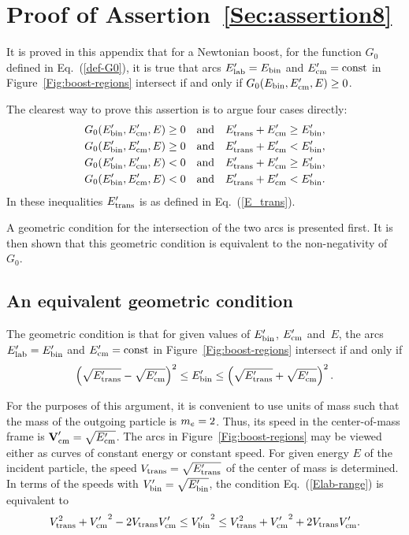 \chapter{Proof of Assertion~\ref{Sec:assertion8}}
\label{Sec:Appendix-B}
It is proved in this appendix that for a Newtonian boost,
for the function $G_0$ defined in Eq.~(\ref{def-G0}),
it is true that arcs $E_{\text{lab}}' = E_{\text{bin}}$ and
$E_{\text{cm}}' = \text{const}$ in Figure~\ref{Fig:boost-regions} intersect if and only if
$G_0( E_{\text{bin}}, E_{\text{cm}}', E ) \ge 0$.

The clearest way to prove this assertion is to
argue four cases directly:
 \begin{align}
  G_0( E_{\text{bin}}',  E_{\text{cm}}', E ) \ge 0 & \quad \text{and}
    \quad E_{\text{trans}}' + E_{\text{cm}}' \ge E_{\text{bin}}',
    \label{first-G0}\\
  G_0( E_{\text{bin}}',  E_{\text{cm}}', E ) \ge 0 & \quad \text{and}
    \quad E_{\text{trans}}' + E_{\text{cm}}' < E_{\text{bin}}', \\
  G_0( E_{\text{bin}}',  E_{\text{cm}}', E ) < 0 & \quad \text{and}
    \quad E_{\text{trans}}' + E_{\text{cm}}' \ge E_{\text{bin}}', \\
   G_0( E_{\text{bin}}',  E_{\text{cm}}', E ) < 0 & \quad \text{and}
    \quad E_{\text{trans}}' + E_{\text{cm}}' < E_{\text{bin}}'.
 \end{align}
 In these inequalities $E_{\text{trans}}'$ is as defined in Eq.~(\ref{E_trans}).

A geometric condition for the intersection of
the two arcs is presented first.  It is then shown that this geometric condition is equivalent
to the non-negativity of~$G_0$.  

\section{An equivalent geometric condition}
The geometric condition is that for given values of $E_{\text{bin}}'$, $E_{\text{cm}}'$ and~$E$,
the arcs $E_{\text{lab}}' = E_{\text{bin}}'$ and
$E_{\text{cm}}' = \text{const}$ in Figure~\ref{Fig:boost-regions} intersect if and only if
\begin{equation}
  \left( \sqrt{E_{\text{trans}}'} - \sqrt{E_{\text{cm}}'} \right)^2 \le E_{\text{bin}}' \le
    \left( \sqrt{E_{\text{trans}}'} + \sqrt{E_{\text{cm}}'} \right)^2.
  \label{Elab-range}
\end{equation}

For the purposes of this argument, it is
convenient to use units of mass such that the mass of the outgoing particle
is $m_e = 2$.  Thus, its speed in the center-of-mass frame is
$\textbf{V}_{\text{cm}}' = \sqrt{E_{\text{cm}}'}$.  The arcs in
Figure~\ref{Fig:boost-regions} may be viewed either as curves of constant energy or constant speed.  For given
energy $E$ of the incident particle, the speed $V_{\text{trans}} = \sqrt{E_{\text{trans}}'}$ of
the center of mass is determined.  In terms of the speeds with
$V_{\text{bin}}' = \sqrt{E_{\text{bin}}'}$, the condition
Eq.~(\ref{Elab-range}) is equivalent to
\begin{equation}
  V_{\text{trans}}^2 + {V_{\text{cm}}'}^2 - 2 V_{\text{trans}} V_{\text{cm}}' \le {V_{\text{bin}}'}^2 \le
  V_{\text{trans}}^2 + {V_{\text{cm}}'}^2 + 2 V_{\text{trans}} V_{\text{cm}}'.
 \label{Elab-range-speed}
\end{equation}

